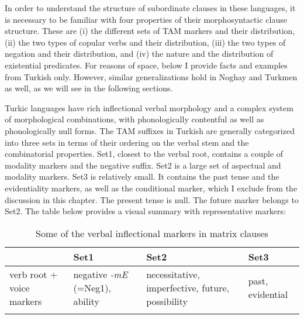 \documentclass[output=paper]{langsci/langscibook}
\begin{document}
In order to understand the structure of subordinate clauses in these languages, 
it is necessary to be familiar with four properties of their morphosyntactic clause structure. 
These are 
(i) the different sets of TAM markers and their distribution, 
(ii) the two types of copular verbs and their distribution, 
(iii) the two types of negation and their distribution, and 
(iv) the nature and the distribution of existential predicates. 
For reasons of space, below I provide facts and examples from Turkish only. 
However, similar generalizations hold in Noghay and Turkmen as well, as we will see in the following sections.

Turkic languages have rich inflectional verbal morphology and a complex system of morphological combinations, 
with phonologically contentful as well as phonologically null forms. 
The TAM suffixes in Turkish are generally categorized into three sets in terms of their ordering on the verbal stem and the combinatorial properties. 
Set1, closest to the verbal root, contains a couple of modality markers and the negative suffix. 
Set2 is a large set of aspectual and modality markers. 
Set3 is relatively small. 
It contains the past tense and the evidentiality markers, as well as the conditional marker, which I exclude from the discussion in this chapter. 
The present tense is null. 
The future marker belongs to Set2. 
The table below provides a visual summary with representative markers:

\begin{table}
    \begin{tabularx}{\textwidth}{XXX|X}
        \lsptoprule
        {} & \textbf{Set1} & \textbf{Set2} & \textbf{Set3} \\
        \midrule
        verb root \newline + voice markers & 
        negative \textit{-mE} \newline (=Neg1), \newline ability &
        necessitative, \newline imperfective, \newline future, \newline possibility &
        past, \newline evidential \\
        \lspbottomrule
    \end{tabularx}
    \caption{Some of the verbal inflectional markers in matrix clauses}
    \label{kelepirtab:key:1}
\end{table}
\end{document}

